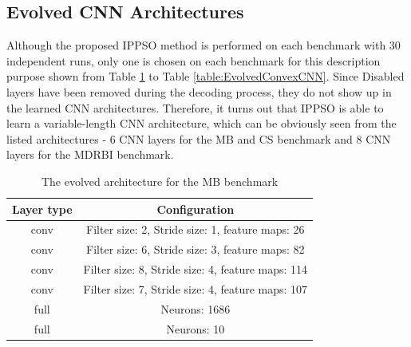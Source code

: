 \documentclass[conference]{IEEEtran}
\begin{document}
\subsection{Evolved CNN Architectures}\label{sec:EvolvedCNN}

Although the proposed IPPSO method is performed on each benchmark with 30 independent runs, only one is chosen on each benchmark for this description purpose shown from Table \ref{table:EvolvedMBCNN} to Table \ref{table:EvolvedConvexCNN}. Since Disabled layers have been removed during the decoding process, they do not show up in the learned CNN architectures. Therefore, it turns out that IPPSO is able to learn a variable-length CNN architecture, which can be obviously seen from the listed architectures - 6 CNN layers for the MB and CS benchmark and 8 CNN layers for the MDRBI benchmark. 

\begin{table}[!t]
	\renewcommand{\arraystretch}{1.3}
	\caption{The evolved architecture for the MB benchmark}
	\label{table:EvolvedMBCNN}
	\centering
	\begin{tabular}{|c|c|}
		\hline
		Layer type & Configuration\\
		\hline
		conv & Filter size: 2, Stride size: 1, feature maps: 26\\
		\hline
		conv & Filter size: 6, Stride size: 3, feature maps: 82\\
		\hline
		conv & Filter size: 8, Stride size: 4, feature maps: 114\\
		\hline
		conv & Filter size: 7, Stride size: 4, feature maps: 107\\
		\hline
		full & Neurons: 1686\\
		\hline
		full & Neurons: 10\\
		\hline
	\end{tabular}
\end{table}
\end{document}
